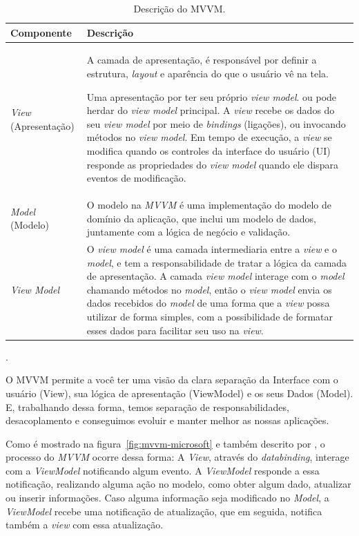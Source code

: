\begin{table}[htp]
    \begin{center}
        \begin{tabular}{|l|p{11cm}|}
            \hline \textbf{Componente} & \textbf{Descrição} \\
            \hline \textit{View} (Apresentação) & 
            A camada de apresentação, é responsável por definir a estrutura, \textit{layout} e aparência do que o usuário vê na tela.
            
            Uma apresentação por ter seu próprio \textit{view model}. ou pode herdar do \textit{view model} principal. A \textit{view} recebe os dados do seu \textit{view model} por meio de \textit{bindings} (ligações), ou invocando métodos no \textit{view model}. Em tempo de execução, a \textit{view} se modifica quando os controles da interface do usuário (UI) responde  as propriedades do \textit{view model} quando ele dispara eventos de modificação.
             \\
            \hline \textit{Model} (Modelo) & 
            O modelo na \textit{MVVM} é uma implementação do modelo de domínio da aplicação, que inclui um modelo de dados, juntamente com a lógica de negócio e validação. \\
            \hline \textit{View Model} & 
            O \textit{view model} é uma camada intermediaria entre a \textit{view} e o \textit{model}, e tem a responsabilidade de tratar a lógica da camada de apresentação. A camada \textit{view model} interage com o \textit{model} chamando métodos no \textit{model}, então o \textit{view model} envia os dados recebidos do \textit{model} de uma forma que a \textit{view} possa utilizar de forma simples, com a possibilidade de formatar esses dados para facilitar seu uso na \textit{view}. \\
            \hline
        \end{tabular}
        \caption{Descrição do \ac{MVVM}.}.
        \label{tbl:mvvm}
    \end{center}
\end{table}

\begin{citacao}
    O MVVM permite a você ter uma visão da clara separação da Interface com o usuário (View), sua lógica de apresentação (ViewModel) e os seus Dados (Model). E, trabalhando dessa forma, temos separação de responsabilidades, desacoplamento e conseguimos evoluir e manter melhor as nossas aplicações. \cite{ferreira_mvvm}
\end{citacao}

Como é mostrado na figura~\ref{fig:mvvm-microsoft} e também descrito por , o processo do \textit{MVVM} ocorre dessa forma: A \textit{View}, através do \textit{databinding}, interage com a \textit{ViewModel} notificando algum evento. A \textit{ViewModel} responde a essa notificação, realizando alguma ação no modelo, como obter algum dado, atualizar ou inserir informações. Caso alguma informação seja modificado no \textit{Model}, a \textit{ViewModel} recebe uma notificação de atualização, que em seguida, notifica também a \textit{view} com essa atualização.
